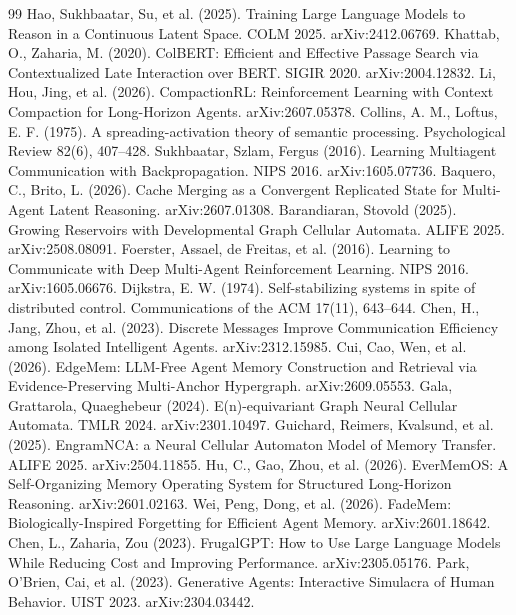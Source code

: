 \documentclass[11pt]{article}
\begin{document}
\begin{thebibliography}{99}
 Hao, Sukhbaatar, Su, et al. (2025). Training Large Language Models to Reason in a Continuous Latent Space. COLM 2025. arXiv:2412.06769.
 Khattab, O., Zaharia, M. (2020). ColBERT: Efficient and Effective Passage Search via Contextualized Late Interaction over BERT. SIGIR 2020. arXiv:2004.12832.
 Li, Hou, Jing, et al. (2026). CompactionRL: Reinforcement Learning with Context Compaction for Long-Horizon Agents. arXiv:2607.05378.
 Collins, A. M., Loftus, E. F. (1975). A spreading-activation theory of semantic processing. Psychological Review 82(6), 407--428.
 Sukhbaatar, Szlam, Fergus (2016). Learning Multiagent Communication with Backpropagation. NIPS 2016. arXiv:1605.07736.
 Baquero, C., Brito, L. (2026). Cache Merging as a Convergent Replicated State for Multi-Agent Latent Reasoning. arXiv:2607.01308.
 Barandiaran, Stovold (2025). Growing Reservoirs with Developmental Graph Cellular Automata. ALIFE 2025. arXiv:2508.08091.
 Foerster, Assael, de Freitas, et al. (2016). Learning to Communicate with Deep Multi-Agent Reinforcement Learning. NIPS 2016. arXiv:1605.06676.
 Dijkstra, E. W. (1974). Self-stabilizing systems in spite of distributed control. Communications of the ACM 17(11), 643--644.
 Chen, H., Jang, Zhou, et al. (2023). Discrete Messages Improve Communication Efficiency among Isolated Intelligent Agents. arXiv:2312.15985.
 Cui, Cao, Wen, et al. (2026). EdgeMem: LLM-Free Agent Memory Construction and Retrieval via Evidence-Preserving Multi-Anchor Hypergraph. arXiv:2609.05553.
 Gala, Grattarola, Quaeghebeur (2024). E(n)-equivariant Graph Neural Cellular Automata. TMLR 2024. arXiv:2301.10497.
 Guichard, Reimers, Kvalsund, et al. (2025). EngramNCA: a Neural Cellular Automaton Model of Memory Transfer. ALIFE 2025. arXiv:2504.11855.
 Hu, C., Gao, Zhou, et al. (2026). EverMemOS: A Self-Organizing Memory Operating System for Structured Long-Horizon Reasoning. arXiv:2601.02163.
 Wei, Peng, Dong, et al. (2026). FadeMem: Biologically-Inspired Forgetting for Efficient Agent Memory. arXiv:2601.18642.
 Chen, L., Zaharia, Zou (2023). FrugalGPT: How to Use Large Language Models While Reducing Cost and Improving Performance. arXiv:2305.05176.
 Park, O'Brien, Cai, et al. (2023). Generative Agents: Interactive Simulacra of Human Behavior. UIST 2023. arXiv:2304.03442.

\end{thebibliography}
\end{document}
